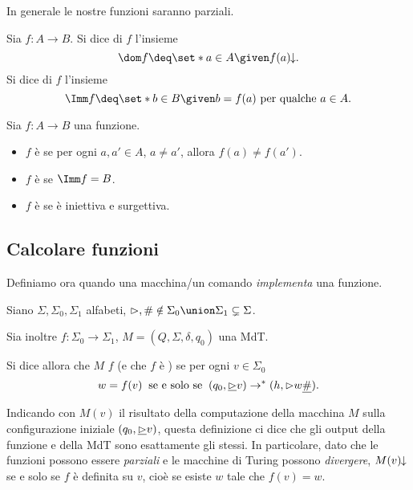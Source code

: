 In generale le nostre funzioni saranno parziali.

\begin{definition}
    Sia $f : A \to B$. Si dice  di $f$ l'insieme \[
        \dom f \deq \set*{a \in A \given f(a)\conv}.
    \]  Si dice  di $f$ l'insieme \[
        \Imm f \deq \set*{b \in B \given b = f(a) \text{ per qualche } a \in A}.
    \]
\end{definition}

\begin{definition}
    Sia $f : A \to B$ una funzione. 
    \begin{itemize}
        \item $f$ è  se per ogni $a, a' \in A$, $a \neq a'$, allora $f(a) \neq f(a')$.
        \item $f$ è  se $\Imm f = B$.
        \item $f$ è  se è iniettiva e surgettiva.     
    \end{itemize}
\end{definition}

\subsection*{Calcolare funzioni}

Definiamo ora quando una macchina/un comando \emph{implementa} una funzione.

\begin{definition}
    Siano $\Sigma, \Sigma_0, \Sigma_1$ alfabeti, $\resp, \# \notin \Sigma_0 \union \Sigma_1 \subsetneq \Sigma$.

    Sia inoltre $f : \Sigma_0 \to \Sigma_1$, $M = (Q, \Sigma, \delta, q_0)$ una MdT.

    Si dice allora che $M$  $f$ (e che $f$ è ) se per ogni $v \in \Sigma_0$ \[
        w = f(v) \;\;\text{se e solo se}\;\; (q_0, \underline{{\vartriangleright}}v) \to^\ast (h, {\vartriangleright} w \underline{\#}).
    \]
\end{definition}

Indicando con $M(v)$ il risultato della computazione della macchina $M$ sulla configurazione iniziale $(q_0, \underline{{\vartriangleright}}v)$, questa definizione ci dice che gli output della funzione e della MdT sono esattamente gli stessi. 
In particolare, dato che le funzioni possono essere \emph{parziali} e le macchine di Turing possono \emph{divergere}, $M(v)\!\!\downarrow$ se e solo se $f$ è definita su $v$, cioè se esiste $w$ tale che $f(v) = w$.

